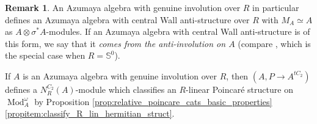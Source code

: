 \documentclass{article}
\DeclareMathOperator{\Mod}{Mod} %
\newcommand{\sphere}{\mathbb{S}^0}
\theoremstyle{definition}
\newtheorem{remark}[equation]{Remark}
\begin{document}
\begin{remark}\label{rmk:Azumaya_gi_Wall_compare}
    An Azumaya algebra with genuine involution over $ R $ in particular defines an Azumaya algebra with central Wall anti-structure over $ R $ with $ M_A \simeq A $ as $ A \otimes \sigma^*A $-modules. 
    If an Azumaya algebra with central Wall anti-structure is of this form, we say that it \emph{comes from the anti-involution on $ A $} (compare \cite[Example 3.1.9]{CDHHLMNNSI}, which is the special case when $ R = \sphere $). 

    If $ A $ is an Azumaya algebra with genuine involution over $ R $, then $ (A, P \to A^{tC_2}) $ defines a $ N^{C_2}_R (A) $-module which classifies an $ R $-linear Poincaré structure on $ \Mod_A^\omega $ by Proposition \ref{prop:relative_poincare_cats_basic_properties}\ref{propitem:classify_R_lin_hermitian_struct}.    
\end{remark}
\end{document}
